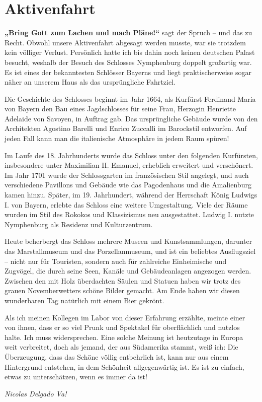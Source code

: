 \section{Aktivenfahrt}

\begin{multicols}{2}

\textbf{„Bring Gott zum Lachen und mach Pläne!“}
sagt der Spruch – und das zu Recht. Obwohl unsere Aktivenfahrt abgesagt werden musste,
war sie trotzdem kein völliger Verlust. Persönlich hatte ich bis dahin noch
keinen deutschen Palast besucht, weshalb der Besuch des Schlosses Nymphenburg
doppelt großartig war. Es ist eines der bekanntesten Schlösser Bayerns und
liegt praktischerweise sogar näher an unserem Haus als das ursprüngliche
Fahrtziel.

Die Geschichte des Schlosses beginnt im Jahr 1664, als Kurfürst Ferdinand
Maria von Bayern den Bau eines Jagdschlosses für seine Frau, Herzogin Henriette
Adelaide von Savoyen, in Auftrag gab. Das ursprüngliche Gebäude wurde von den
Architekten Agostino Barelli und Enrico Zuccalli im Barockstil entworfen. Auf
jeden Fall kann man die italienische Atmosphäre in jedem Raum spüren!

Im Laufe des 18. Jahrhunderts wurde das Schloss unter den folgenden
Kurfürsten, insbesondere unter Maximilian II. Emanuel, erheblich erweitert und
verschönert. Im Jahr 1701 wurde der Schlossgarten im französischen Stil
angelegt, und auch verschiedene Pavillons und Gebäude wie das Pagodenhaus und
die Amalienburg kamen hinzu. Später, im 19. Jahrhundert, während der Herrschaft
König Ludwigs I. von Bayern, erlebte das Schloss eine weitere Umgestaltung.
Viele der Räume wurden im Stil des Rokokos und Klassizismus neu ausgestattet. Ludwig
I. nutzte Nymphenburg als Residenz und Kulturzentrum.

Heute beherbergt das Schloss mehrere Museen und Kunstsammlungen, darunter
das Marstallmuseum und das Porzellanmuseum, und ist ein beliebtes Ausflugsziel
– nicht nur für Touristen, sondern auch für zahlreiche Einheimische und
Zugvögel, die durch seine Seen, Kanäle und Gebäudeanlagen angezogen werden. Zwischen
den mit Holz überdachten Säulen und Statuen haben wir trotz des grauen
Novemberwetters schöne Bilder gemacht. Am Ende haben wir diesen wunderbaren Tag
natürlich mit einem Bier gekrönt.

Als ich meinen Kollegen im Labor von dieser Erfahrung erzählte, meinte
einer von ihnen, dass er so viel Prunk und Spektakel für oberflächlich und
nutzlos halte. Ich muss widersprechen. Eine solche Meinung ist heutzutage in
Europa weit verbreitet, doch als jemand, der aus Südamerika stammt, weiß ich:
Die Überzeugung, dass das Schöne völlig entbehrlich ist, kann nur aus einem
Hintergrund entstehen, in dem Schönheit allgegenwärtig ist. Es ist zu einfach,
etwas zu unterschätzen, wenn es immer da ist!

	\begin{flushright}
		\hfill\emph{Nicolas Delgado Va!}
	\end{flushright}
\end{multicols}
%

